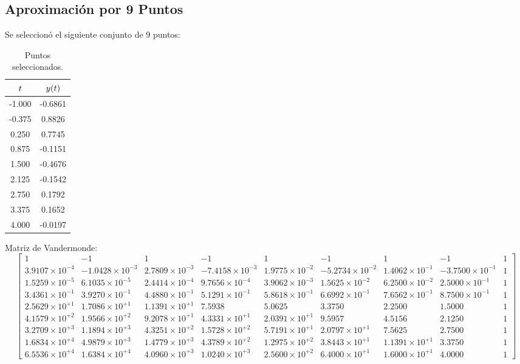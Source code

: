 \subsection{Aproximación por 9 Puntos}
Se seleccionó el siguiente conjunto de 9 puntos:
\begin{table}[H]
\centering
\begin{tabular}{cc}
\hline
$\boldmath{t}$ & $\boldmath{y(t)}$ \\ \hline
-1.000           & -0.6861           \\
-0.375         & 0.8826            \\
0.250           & 0.7745            \\
0.875          & -0.1151           \\
1.500           & -0.4676           \\
2.125          & -0.1542           \\
2.750           & 0.1792            \\
3.375          & 0.1652            \\
4.000            & -0.0197           \\ \hline
\end{tabular}
\caption{Puntos seleccionados.}
\label{tab:9points}
\end{table}
Matriz de Vandermonde:
\begin{equation*}
    \left[
    \begin{smallmatrix}
1 & -1 &  1  &  -1 &  1 &  -1 &  1 &  -1 &  1\\
3.9107\times10^{-4} & -1.0428\times10^{-3} &  2.7809\times10^{-3} &  -7.4158\times10^{-3} &  1.9775\times10^{-2} &  -5.2734\times10^{-2} &  1.4062\times10^{-1} &  -3.7500\times10^{-1} &  1\\
1.5259\times10^{-5} &  6.1035\times10^{-5} &  2.4414\times10^{-4} &  9.7656\times10^{-4} &  3.9062\times10^{-3} &  1.5625\times10^{-2} &  6.2500\times10^{-2} &  2.5000\times10^{-1} &  1\\
3.4361\times10^{-1} &  3.9270\times10^{-1} &  4.4880\times10^{-1} &  5.1291\times10^{-1} &  5.8618\times10^{-1} &  6.6992\times10^{-1} &  7.6562\times10^{-1} &  8.7500\times10^{-1} &  1\\
2.5629\times10^{+1} &  1.7086\times10^{+1} &  1.1391\times10^{+1} &  7.5938 &  5.0625 &  3.3750 &  2.2500 &  1.5000 &  1\\
4.1579\times10^{+2} &  1.9566\times10^{+2} &  9.2078\times10^{+1} &  4.3331\times10^{+1} &  2.0391\times10^{+1} &  9.5957 &  4.5156 &  2.1250 &  1\\
3.2709\times10^{+3} &  1.1894\times10^{+3} &  4.3251\times10^{+2} &  1.5728\times10^{+2} &  5.7191\times10^{+1} &  2.0797\times10^{+1} &  7.5625 &  2.7500 &  1\\
1.6834\times10^{+4} &  4.9879\times10^{+3} &  1.4779\times10^{+3} &  4.3789\times10^{+2} &  1.2975\times10^{+2} &  3.8443\times10^{+1} &  1.1391\times10^{+1} &  3.3750 &  1\\
6.5536\times10^{+4} &  1.6384\times10^{+4} &  4.0960\times10^{+3} &  1.0240\times10^{+3} &  2.5600\times10^{+2} &  6.4000\times10^{+1} &  1.6000\times10^{+1} &  4.0000 &  1
    \end{smallmatrix}
    \right]
\end{equation*}


